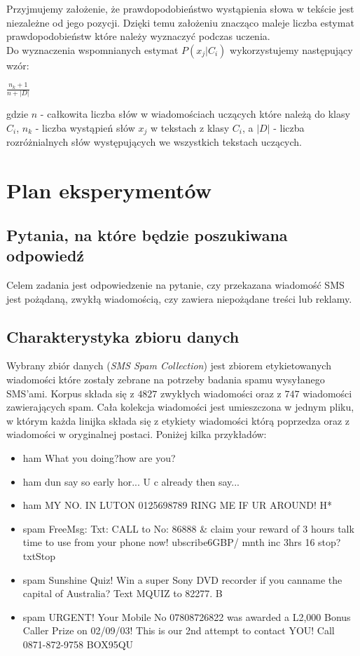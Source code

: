 \documentclass[a4paper,12pt]{article}
\begin{document}
Przyjmujemy założenie, że prawdopodobieństwo wystąpienia słowa w tekście jest niezależne od jego pozycji. Dzięki temu założeniu znacząco maleje liczba estymat prawdopodobieństw które należy wyznaczyć podczas uczenia.\\

Do wyznaczenia wspomnianych estymat $P(x_j|C_i)$ wykorzystujemy następujący wzór:

\begin{center}
$\frac{n_k + 1}{n + |D|}$
\end{center}

gdzie $n$ - całkowita liczba słów w wiadomościach uczących które należą do klasy $C_i$, $n_k$ - liczba wystąpień słów $x_j$ w tekstach z klasy $C_i$, a $|D|$ - liczba rozróżnialnych słów występujących we wszystkich tekstach uczących.

\section{Plan eksperymentów}

\subsection{Pytania, na które będzie poszukiwana odpowiedź}

Celem zadania jest odpowiedzenie na pytanie, czy przekazana wiadomość SMS jest pożądaną, zwykłą wiadomością, czy zawiera niepożądane treści lub reklamy.

\subsection{Charakterystyka zbioru danych}

Wybrany zbiór danych (\textit{SMS Spam Collection}) jest zbiorem etykietowanych wiadomości które zostały zebrane na potrzeby badania spamu wysyłanego SMS'ami. Korpus składa się z $4827$ zwykłych wiadomości oraz z $747$ wiadomości zawierających spam. Cała kolekcja wiadomości jest umieszczona w jednym pliku, w którym każda linijka składa się z etykiety wiadomości którą poprzedza oraz z wiadomości w oryginalnej postaci. Poniżej kilka przykładów:

\begin{itemize}
	\item ham What you doing?how are you? 
	\item ham dun say so early hor... U c already then say... 
	\item ham MY NO. IN LUTON 0125698789 RING ME IF UR AROUND! H* 
	\item spam FreeMsg: Txt: CALL to No: 86888 \& claim your reward of 3 hours talk time to use from your phone now! ubscribe6GBP/ mnth inc 3hrs 16 stop?txtStop 
	\item spam Sunshine Quiz! Win a super Sony DVD recorder if you canname the capital of Australia? Text MQUIZ to 82277. B 
	\item spam URGENT! Your Mobile No 07808726822 was awarded a L2,000 Bonus Caller Prize on 02/09/03! This is our 2nd attempt to contact YOU! Call 0871-872-9758 BOX95QU 
\end{itemize}
\end{document}
